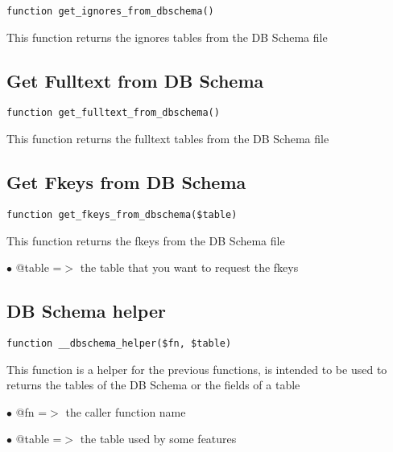 \documentclass[a4paper]{book}
\begin{document}
\begin{lstlisting}
function get_ignores_from_dbschema()
\end{lstlisting}

This function returns the ignores tables from the DB Schema file

\hypertarget{toc89}{}
\subsection{Get Fulltext from DB Schema}

\begin{lstlisting}
function get_fulltext_from_dbschema()
\end{lstlisting}

This function returns the fulltext tables from the DB Schema file

\hypertarget{toc90}{}
\subsection{Get Fkeys from DB Schema}

\begin{lstlisting}
function get_fkeys_from_dbschema($table)
\end{lstlisting}

This function returns the fkeys from the DB Schema file

\begin{compactitem}
\item[\color{myblue}$\bullet$] @table =$>$ the table that you want to request the fkeys
\end{compactitem}

\hypertarget{toc91}{}
\subsection{DB Schema helper}

\begin{lstlisting}
function __dbschema_helper($fn, $table)
\end{lstlisting}

This function is a helper for the previous functions, is intended to be used
to returns the tables of the DB Schema or the fields of a table

\begin{compactitem}
\item[\color{myblue}$\bullet$] @fn    =$>$ the caller function name
\item[\color{myblue}$\bullet$] @table =$>$ the table used by some features
\end{compactitem}
\end{document}
